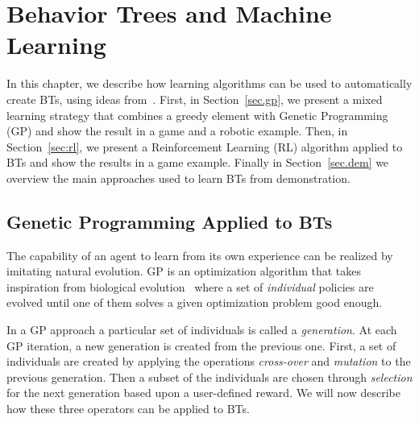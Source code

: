 
\graphicspath{{./learning/figures/}}



\chapter{Behavior Trees and Machine Learning}
\label{ch:learning}

In this chapter, we describe how learning algorithms can be used to automatically create BTs, using ideas from~\cite{pereira2015framework,colledanchise2015learning}.
First, in Section~\ref{sec.gp}, we present a mixed learning strategy that combines a greedy element with Genetic Programming (GP) and show the result in a game and a robotic example. Then, in Section~\ref{sec:rl}, we present a Reinforcement Learning (RL) algorithm applied to BTs and show the results in a game example. Finally in Section~\ref{sec.dem} we overview the main approaches used to learn BTs from demonstration.




\section{Genetic Programming Applied to BTs}
\label{BG.GP}
The capability of an agent to learn from its own experience can be realized by imitating natural evolution. GP is an optimization algorithm that takes inspiration from biological evolution~\cite{rechenberg1994evolution} where a set of \emph{individual} policies are evolved until one of them solves a given optimization problem good enough.

In a GP approach a  particular set of individuals is called a \emph{generation}. At each GP iteration, a new generation is created from the previous one. First, a set of individuals are created by applying the operations \emph{cross-over} and \emph{mutation} to the previous generation. Then a subset of the individuals are chosen through \emph{selection} for the next generation based upon a user-defined reward. We will now describe how these three operators can be applied to BTs.


%


